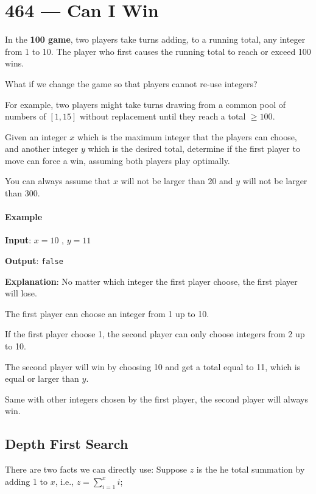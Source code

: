 \section{464 --- Can I Win}
In the \textbf{100 game}, two players take turns adding, to a running total, any integer from 1 to 10. The player who first causes the running total to reach or exceed 100 wins.

What if we change the game so that players cannot re-use integers?

For example, two players might take turns drawing from a common pool of numbers of $[1, 15]$ without replacement until they reach a total $\geq 100$.

Given an integer $x$ which is the maximum integer that the players can choose, and another integer $y$ which is the desired total, determine if the first player to move can force a win, assuming both players play optimally.

You can always assume that $x$ will not be larger than 20 and $y$ will not be larger than 300.

\paragraph{Example}

\begin{flushleft}
\textbf{Input}: $x = 10$ , $y = 11$

\textbf{Output}: \texttt{false}

\textbf{Explanation}: No matter which integer the first player choose, the first player will lose.

The first player can choose an integer from 1 up to 10.

If the first player choose 1, the second player can only choose integers from 2 up to 10.

The second player will win by choosing 10 and get a total equal to 11, which is equal or larger than $y$.

Same with other integers chosen by the first player, the second player will always win.
\end{flushleft}

\subsection{Depth First Search}

There are two facts we can directly use: Suppose $z$ is the he total summation by adding 1 to $x$, i.e., $z=\sum\limits_{i=1}^{x} i$;


